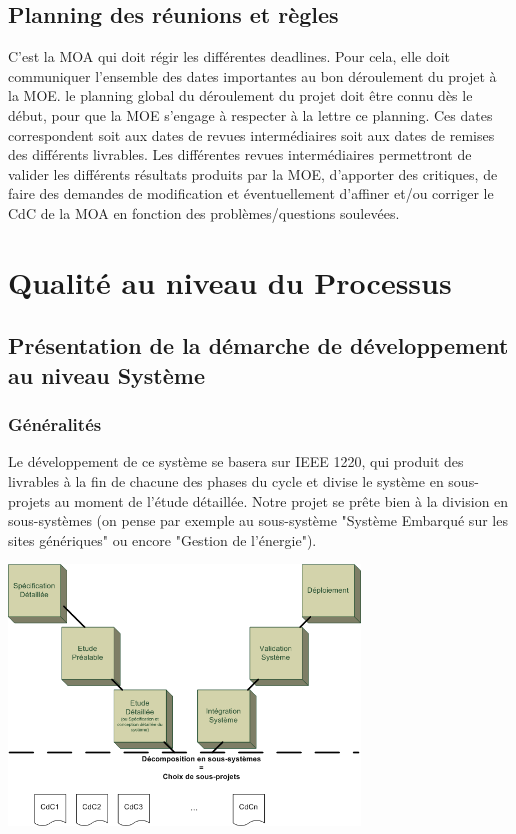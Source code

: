   \subsection{Planning des réunions et règles}
  C'est la MOA qui doit régir les différentes deadlines. Pour cela, elle doit communiquer l'ensemble des dates importantes au bon déroulement du projet à la MOE. le planning global du déroulement du projet doit être connu dès le début, pour que la MOE s'engage à respecter à la lettre ce planning. Ces dates correspondent soit aux dates de revues intermédiaires soit aux dates de remises des différents livrables.
Les différentes revues intermédiaires permettront de valider les différents résultats produits par la MOE, d'apporter des critiques, de faire des demandes de modification et éventuellement d'affiner et/ou corriger le CdC de la MOA en fonction des problèmes/questions soulevées.

\section{Qualité au niveau du Processus}
  \subsection{Présentation de la démarche de développement au niveau Système}
  
    \subsubsection{Généralités}
     Le développement de ce système se basera sur IEEE 1220, qui produit des livrables à la fin de chacune des phases du cycle et divise le système en sous-projets au moment de l'étude détaillée.
     Notre projet se prête bien à la division en sous-systèmes (on pense par exemple au sous-système "Système Embarqué sur les sites génériques" ou encore "Gestion de l'énergie").  \\
     
     \begin{center}\includegraphics [width=0.7\textwidth]{IEEE1020.png}\end{center}


